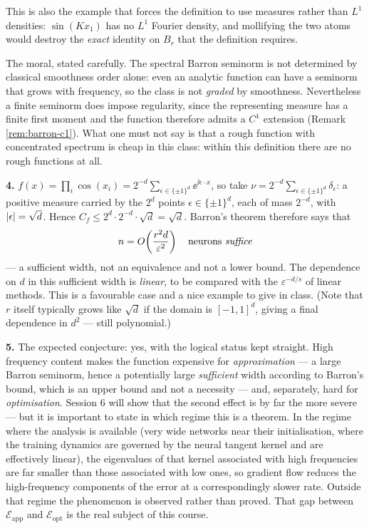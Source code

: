 \documentclass[11pt,a4paper]{article}
\begin{document}
This is also the example that forces the definition to use measures rather than $L^1$ densities:
$\sin(Kx_1)$ has no $L^1$ Fourier density, and mollifying the two atoms would destroy the
\emph{exact} identity on $B_r$ that the definition requires.

The moral, stated carefully. The spectral Barron seminorm is not determined by classical smoothness
order alone: even an analytic function can have a seminorm that grows with frequency, so the class
is not \emph{graded} by smoothness. Nevertheless a finite seminorm does impose regularity, since the
representing measure has a finite first moment and the function therefore admits a $C^1$ extension
(Remark \ref{rem:barron-c1}). What one must not say is that a rough function with concentrated
spectrum is cheap in this class: within this definition there are no rough functions at all.

\textbf{4.} $f(x) = \prod_i \cos(x_i) = 2^{-d}\sum_{\epsilon \in \{\pm1\}^d} \ee^{\ii \epsilon\cdot x}$,
so take $\nu = 2^{-d}\sum_{\epsilon \in \{\pm1\}^d}\delta_\epsilon$: a positive measure carried by
the $2^d$ points $\epsilon \in \{\pm1\}^d$, each of mass $2^{-d}$, with $\left\lvert \epsilon \right\rvert = \sqrt d$.
Hence $C_f \le 2^d \cdot 2^{-d}\cdot \sqrt d = \sqrt d$. Barron's theorem therefore says that
\[
n = O\!\left( \frac{r^2 d}{\varepsilon^2} \right) \quad \text{neurons \emph{suffice}}
\]
--- a sufficient width, not an equivalence and not a lower bound. The dependence on $d$ in this
sufficient width is \emph{linear}, to be compared with the $\varepsilon^{-d/s}$ of linear methods. This is a favourable
case and a nice example to give in class. (Note that $r$ itself typically grows like $\sqrt d$ if
the domain is $[-1,1]^d$, giving a final dependence in $d^2$ --- still polynomial.)

\textbf{5.} The expected conjecture: yes, with the logical status kept straight. High frequency
content makes the function expensive for \emph{approximation} --- a large Barron seminorm, hence a
potentially large \emph{sufficient} width according to Barron's bound, which is an upper bound and
not a necessity --- and, separately, hard for \emph{optimisation}. Session 6 will show that the second effect is by far the more severe --- but it
is important to state in which regime this is a theorem. In the regime where the analysis is
available (very wide networks near their initialisation, where the training dynamics are governed by
the neural tangent kernel and are effectively linear), the eigenvalues of that kernel associated
with high frequencies are far smaller than those associated with low ones, so gradient flow reduces
the high-frequency components of the error at a correspondingly slower rate. Outside that regime the
phenomenon is observed rather than proved. That gap between $\mathcal E_{\text{app}}$ and
$\mathcal E_{\text{opt}}$ is the real subject of this course.
\end{document}
